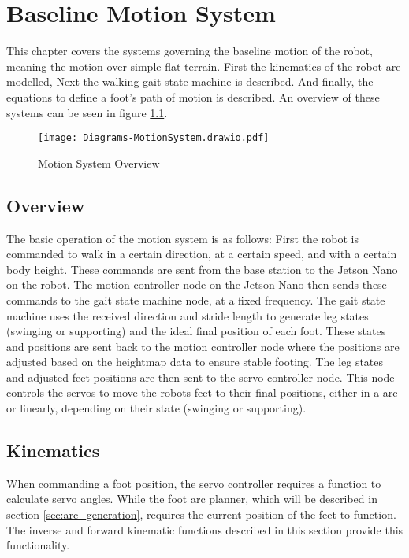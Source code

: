 \chapter{Baseline Motion System} \label{chap:motion}
    This chapter covers the systems governing the baseline motion of the robot, meaning the motion over simple flat terrain. First the kinematics of the robot are modelled, Next the walking gait state machine is described. And finally, the equations to define a foot's path of motion is described. An overview of these systems can be seen in figure \ref{fig:motion_system}.
    \begin{figure}[h]
        \centering
        \texttt{[image: Diagrams-MotionSystem.drawio.pdf]}
        \caption{Motion System Overview}
        \label{fig:motion_system}
    \end{figure}
    \section{Overview}
        The basic operation of the motion system is as follows: First the robot is commanded to walk in a certain direction, at a certain speed, and with a certain body height. These commands are sent from the base station to the Jetson Nano on the robot. The motion controller node on the Jetson Nano then sends these commands to the gait state machine node, at a fixed frequency. The gait state machine uses the received direction and stride length to generate leg states (swinging or supporting) and the ideal final position of each foot. These states and positions are sent back to the motion controller node where the positions are adjusted based on the heightmap data to ensure stable footing. The leg states and adjusted feet positions are then sent to the servo 
        controller node. This node controls the servos to move the robots feet to their final positions, either in a arc or linearly, depending on their state (swinging or supporting). %

    \section{Kinematics}
        When commanding a foot position, the servo controller requires a function to calculate servo angles. While the foot arc planner, which will be described in section \ref{sec:arc_generation}, requires the current position of the feet to function. The inverse and forward kinematic functions described in this section provide this functionality. 
        
